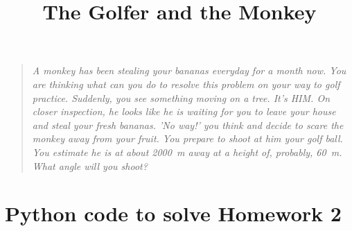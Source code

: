 \documentclass[12pt,letterpaper]{article}
\title{The Golfer and the Monkey}
\begin{document}

\begin{quote}
    \textit{A monkey has been stealing your bananas everyday for a month now. You are thinking what can you do to resolve this problem on your way to golf practice. Suddenly, you see something moving on a tree. It's HIM. On closer inspection, he looks like he is waiting for you to leave your house and steal your fresh bananas. 'No way!' you think and decide to scare the monkey away from your fruit. You prepare to shoot at him your golf ball. You estimate he is at about \SI{2000}{\m} away at a height of, probably, \SI{60}{\m}. What angle will you shoot?}
\end{quote}





\newpage
\appendix


\section[]{Python code to solve Homework 2} 
\label{sec:CodeHw02}



% 
\end{document}
